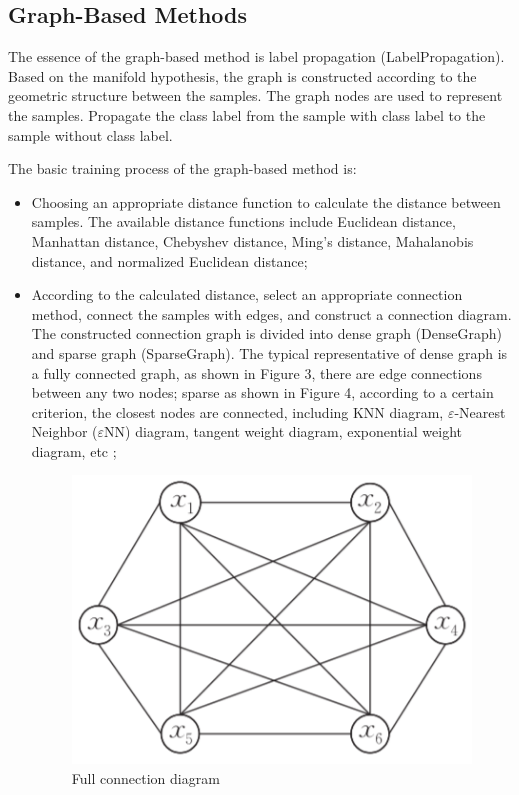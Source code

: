 \documentclass[11pt,en]{elegantpaper}
\begin{document}
\subsection{Graph-Based Methods}
The essence of the graph-based method is label propagation (LabelPropagation). Based on the manifold hypothesis, the graph is constructed according to the geometric structure between the samples. The graph nodes are used to represent the samples. Propagate the class label from the sample with class label to the sample without class label.


The basic training process of the graph-based method is:
\begin{itemize}
	\item Choosing an appropriate distance function to calculate the distance between samples. The available distance functions include Euclidean distance, Manhattan distance, Chebyshev distance, Ming's distance, Mahalanobis distance, and normalized Euclidean distance;
	\item According to the calculated distance, select an appropriate connection method, connect the samples with edges, and construct a connection diagram. The constructed connection graph is divided into dense graph (DenseGraph) and sparse graph (SparseGraph). The typical representative of dense graph is a fully connected graph, as shown in Figure 3, there are edge connections between any two nodes; sparse as shown in Figure 4, according to a certain criterion, the closest nodes are connected, including KNN diagram, $\varepsilon$-Nearest Neighbor ($\varepsilon$NN) diagram, tangent weight diagram, exponential weight diagram, etc ;
	\begin{figure}[H]
		\centering
		\includegraphics[scale=0.4]{figure/3.png}
		\caption{Full connection diagram}
	\end{figure}

\end{itemize}
\end{document}
